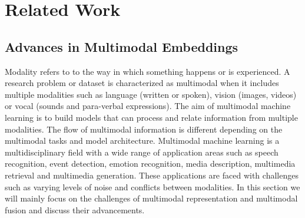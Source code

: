 \documentclass{article}
\newcommand{\todo}[1]{\textbf{\textcolor{Red}{(TODO: #1)}}}
\begin{document}

\section{Related Work}
\subsection{Advances in Multimodal Embeddings} \label{subsection:embeds}
Modality refers to to the way in which something happens or is experienced. %
A research problem or dataset is characterized as multimodal when it includes multiple modalities such as language (written or spoken), vision (images, videos) or vocal (sounds and para-verbal expressions). The aim of multimodal machine learning is to build models that can process and relate information from multiple modalities. The flow of multimodal information is different depending on the multimodal tasks and model architecture. Multimodal machine learning is a multidisciplinary field with a wide range of application areas such as speech recognition, event detection, emotion recognition, media description, multimedia retrieval and multimedia generation. These applications are faced with challenges such as varying levels of noise and conflicts between modalities. In this section we will mainly focus on the challenges of multimodal representation and multimodal fusion and discuss their advancements.
\end{document}
